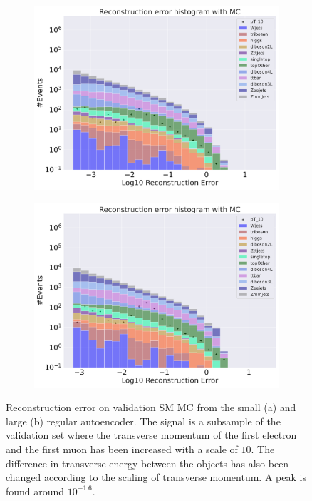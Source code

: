 \begin{figure}[!htb]
    \centering
    \begin{subfigure}{.45\textwidth}
        \includegraphics[width=\textwidth]{Figures/AE_testing/small/b_data_recon_big_rm3_feats_sig_pT_10.pdf}
        \caption{}
        \label{fig:ae_small_pt_10}
    \end{subfigure}
    \hfill 
    \begin{subfigure}{.45\textwidth}
        \includegraphics[width=\textwidth]{Figures/AE_testing/big/b_data_recon_big_rm3_feats_sig_pT_10.pdf}
        \caption{}
        \label{fig:ae_big_pt_10}
    \end{subfigure}
    \hfill 
    \caption[AE | Reconstruction error $p_T$ altering of 10]{Reconstruction error on validation SM MC from the small (a) and large (b) regular autoencoder. The signal is a subsample of the validation 
    set where the transverse momentum of the first electron and the first muon has been increased with a scale of $10$. The difference in transverse energy between the objects has also been changed according to the scaling of transverse momentum. 
    A peak is found around $10^{-1.6}$.}
    \label{fig:ae_big_small_pt_10}
\end{figure}




